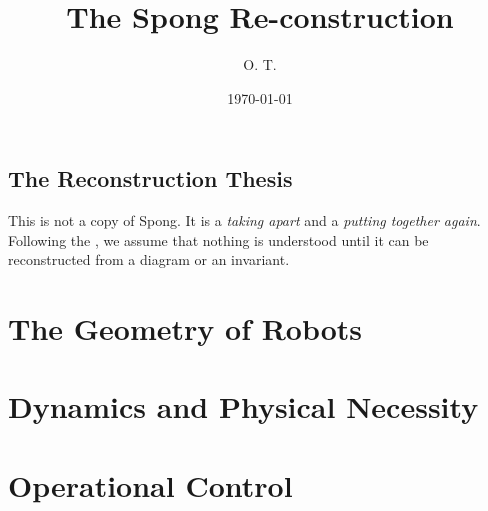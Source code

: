 \documentclass{otbook}
\title{The Spong Re-construction}
\author{O. T.}
\date{\today}
\begin{document}
\frontmatter
\makeotbooktitle

\chapter{The Reconstruction Thesis}
This is not a copy of Spong. It is a \textit{taking apart} and a \textit{putting together again}. Following the , we assume that nothing is understood until it can be reconstructed from a diagram or an invariant.

\tableofcontents

\mainmatter

\part{The Geometry of Robots}


\part{Dynamics and Physical Necessity}


\part{Operational Control}


\backmatter

\printotindex

\printotbibliography
\end{document}

